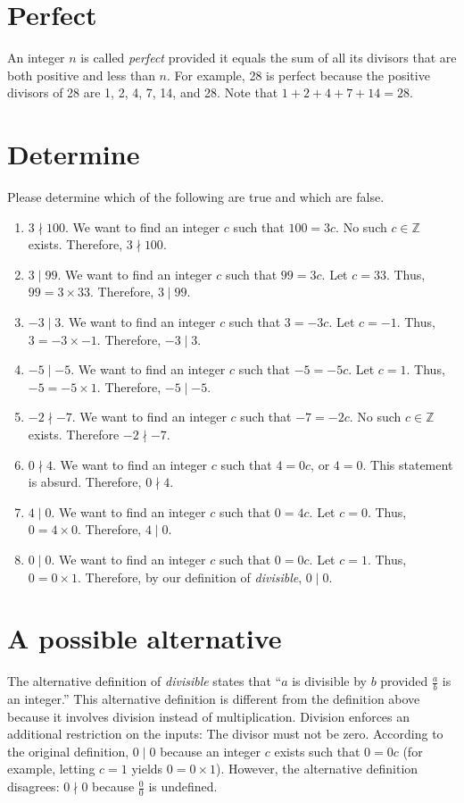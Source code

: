 \documentclass[12pt]{article}
\begin{document}
\section*{Perfect}
An integer $n$ is called \textit{perfect} provided it equals the sum of all its divisors that are both positive and less than $n$. For example, 28 is perfect because the positive divisors of 28 are 1, 2, 4, 7, 14, and 28. Note that $1+2+4+7+14=28$.
\section{Determine}
Please determine which of the following are true and which are false.
\begin{enumerate}
    \item$3\nmid 100$. We want to find an integer $c$ such that $100=3c$. No such $c\in\mathbb{Z}$ exists. Therefore, $3\nmid 100$.
    \item$3 \mid 99$. We want to find an integer $c$ such that $99=3c$. Let $c=33$. Thus, $99=3\times 33$. Therefore, $3 \mid 99$.
    \item$-3 \mid 3$. We want to find an integer $c$ such that $3=-3c$. Let $c=-1$. Thus, $3=-3\times-1$. Therefore, $-3 \mid 3.$
    \item$-5 \mid -5$. We want to find an integer $c$ such that $-5=-5c$. Let $c=1$. Thus, $-5=-5\times 1$. Therefore, $-5 \mid -5.$
    \item$-2\nmid-7$. We want to find an integer $c$ such that $-7=-2c$. No such $c\in\mathbb{Z}$ exists. Therefore $-2\nmid -7$.
    \item$0\nmid 4$. We want to find an integer $c$ such that $4=0c$, or $4=0$. This statement is absurd. Therefore, $0\nmid 4$.
    \item$4 \mid 0$. We want to find an integer $c$ such that $0=4c$. Let $c=0$. Thus, $0=4\times 0$. Therefore, $4 \mid 0$.
    \item$0 \mid 0$. We want to find an integer $c$ such that $0=0c$. Let $c=1$. Thus, $0=0\times 1$. Therefore, by our definition of \textit{divisible}, $0 \mid 0$.
\end{enumerate}
\section{A possible alternative}
The alternative definition of \textit{divisible} states that ``$a$ is divisible by $b$ provided $\frac{a}{b}$ is an integer.'' This alternative definition is different from the definition above because it involves division instead of multiplication. Division enforces an additional restriction on the inputs: The divisor must not be zero. According to the original definition, $0 \mid 0$ because an integer $c$ exists such that $0=0c$ (for example, letting $c=1$ yields $0=0\times 1$). However, the alternative definition disagrees: $0\nmid 0$ because $\frac{0}{0}$ is undefined.
\end{document}
